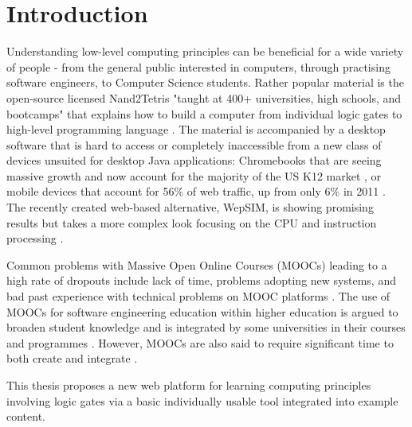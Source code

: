 \chapter{Introduction}
\label{Introduction}


Understanding low-level computing principles can be beneficial for a wide variety of people - from the general public interested in computers, through practising software engineers, to Computer Science students.
Rather popular material is the open-source licensed Nand2Tetris "taught at 400+ universities, high schools, and bootcamps" that explains how to build a computer from individual logic gates to high-level programming language \parencite{nand2tetrisweb}.
The material is accompanied by a desktop software that is hard to access or completely inaccessible from a new class of devices unsuited for desktop Java applications: Chromebooks that are seeing massive growth and now account for the majority of the US K12 market \parencite{Boreham_2019} \parencite{IDC_2021}, or mobile devices that account for 56\% of web traffic, up from only 6\% in 2011 \parencite{StatCounter_2021}.
The recently created web-based alternative, WepSIM, is showing promising results but takes a more complex look focusing on the CPU and instruction processing \parencite{garcia2019wepsim}.

Common problems with Massive Open Online Courses (MOOCs) leading to a high rate of dropouts include lack of time, problems adopting new systems, and bad past experience with technical problems on MOOC platforms \parencite{onah2014dropout}.
The use of MOOCs for software engineering education within higher education is argued to broaden student knowledge and is integrated by some universities in their courses and programmes \parencite{stikkolorum2014mooc}. However, MOOCs are also said to require significant time to both create and integrate \parencite{stikkolorum2014mooc}.

This thesis proposes a new web platform for learning computing principles involving logic gates via a basic individually usable tool integrated into example content.
